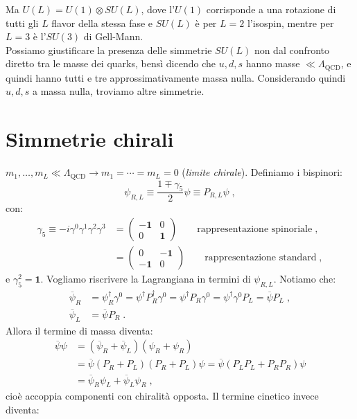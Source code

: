 \documentclass[12pt,a4paper]{article}
\theoremstyle{definition}
\newcommand{\adj}[1]{#1^{\dagger}}
\numberwithin{equation}{section}
\begin{document}
Ma $U(L)=U(1)\otimes SU(L)$, dove l'$U(1)$ corrisponde a una rotazione di tutti gli $L$ flavor della stessa fase e $SU(L)$ è per $L=2$ l'isospin, mentre per $L=3$ è l'$SU(3)$ di Gell-Mann. \\
Possiamo giustificare la presenza delle simmetrie $SU(L)$ non dal confronto diretto tra le masse dei quarks, bensì dicendo che $u,d,s$ hanno masse $\ll \Lambda_{\mathrm{QCD}}$, e quindi hanno tutti e tre approssimativamente massa nulla. Considerando quindi $u,d,s$ a massa nulla, troviamo altre simmetrie.
\cleardoublepage
\section{Simmetrie chirali}
$m_1,\ldots,m_L\ll \Lambda_{\mathrm{QCD}}\longrightarrow m_1=\cdots= m_L=0$ (\emph{limite chirale}). Definiamo i bispinori:
\begin{equation}
\psi_{R,L}\equiv \frac{1\mp \gamma_5}{2}\psi\equiv P_{R,L}\psi\;,
\end{equation}
con:
\begin{align*}
\gamma_5\equiv -i\gamma^0\gamma^1\gamma^2\gamma^3 &=\left(\begin{matrix}
-\mathbf{1} & 0 \\
0 & \mathbf{1}
\end{matrix}\right) \qquad \mbox{rappresentazione spinoriale}\;, \\
&=\left(\begin{matrix}
0 & -\mathbf{1} \\
-\mathbf{1} & 0
\end{matrix}\right)\qquad \mbox{rappresentazione standard}\;,
\end{align*}
e $\gamma_5^2=\mathbf{1}$. Vogliamo riscrivere la Lagrangiana in termini di $\psi_{R,L}$. Notiamo che:
\begin{align*}
\overline{\psi}_R&= \adj{\psi}_R\gamma^0=\adj{\psi}\adj{P}_R\gamma^0=\adj{\psi}P_R\gamma^0=\adj{\psi}\gamma^0P_L=\overline{\psi}P_L\;, \\
\overline{\psi}_L&= \overline{\psi}P_R\;.
\end{align*}
Allora il termine di massa diventa:
\begin{align*}
\overline{\psi}\psi &=(\overline{\psi}_R+\overline{\psi}_L)(\psi_R+\psi_R) \\
&= \overline{\psi}(P_R+P_L)(P_R+P_L)\psi=\overline{\psi}(P_LP_L+P_RP_R)\psi \\
&= \overline{\psi}_R\psi_L+\overline{\psi}_L\psi_R\;,
\end{align*}
cioè accoppia componenti con chiralità opposta. Il termine cinetico invece diventa:
\end{document}
